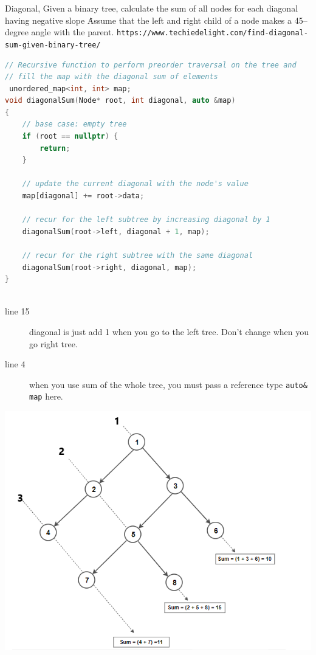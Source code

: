 \documentclass[a4paper,11pt,twoside]{book}
\begin{document}
	Diagonal, Given a binary tree, calculate the sum of all nodes for each diagonal having negative slope \. Assume that the left and right child of a node makes a 45–degree angle with the parent. \verb|https://www.techiedelight.com/find-diagonal-sum-given-binary-tree/|
\begin{lstlisting}[frame=single, language=c++]
// Recursive function to perform preorder traversal on the tree and
// fill the map with the diagonal sum of elements
 unordered_map<int, int> map;
void diagonalSum(Node* root, int diagonal, auto &map)
{
	// base case: empty tree
	if (root == nullptr) {
		return;
	}
	
	// update the current diagonal with the node's value
	map[diagonal] += root->data;
	
	// recur for the left subtree by increasing diagonal by 1
	diagonalSum(root->left, diagonal + 1, map);
	
	// recur for the right subtree with the same diagonal
	diagonalSum(root->right, diagonal, map);
}
	
\end{lstlisting}
\begin{description}
	\item[line 15] diagonal is just add 1 when you go to the left tree. Don't change when you go right tree. 
	\item[line 4] when you use sum of the whole tree, you must pass a reference type \texttt{auto\& map} here. 
\end{description}	

\begin{center}
	\includegraphics[scale=0.56]{pics/dt.png} 
\end{center}
\end{document}
